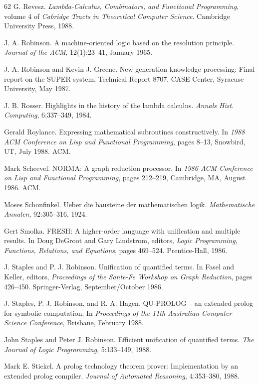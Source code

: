 \begin{thebibliography}{62}
G. Revesz.
\emph{Lambda-Calculus, Combinators, and Functional Programming}, volume 4 of
\emph{Cabridge Tracts in Theoretical Computer Science}.
Cambridge University Press, 1988.

J. A. Robinson.
A machine-oriented logic based on the resolution principle.
\emph{Journal of the ACM}, 12(1):23--41, January 1965.

J. A. Robinson and Kevin J. Greene.
New generation knowledge processing: Final report on the SUPER system.
Technical Report 8707, CASE Center, Syracuse University, May 1987.

J. B. Rosser.
Highlights in the history of the lambda calculus.
\emph{Annals Hist. Computing}, 6:337--349, 1984.

Gerald Roylance.
Expressing mathematical subroutines constructively.
In \emph{1988 ACM Conference on Lisp and Functional Programming}, pages 8--13,
Snowbird, UT, July 1988. ACM.

Mark Scheevel.
NORMA: A graph reduction processor.
In \emph{1986 ACM Conference on Lisp and Functional Programming}, pages 212--219,
Cambridge, MA, August 1986. ACM.

Moses Schonfinkel.
Ueber die bausteine der mathematischen logik.
\emph{Mathematische Annalen}, 92:305--316, 1924.

Gert Smolka.
FRESH: A higher-order language with unification and multiple results.
In Doug DeGroot and Gary Lindstrom, editors, \emph{Logic Programming,
Functions, Relations, and Equations}, pages 469--524. Prentice-Hall, 1986.

J. Staples and P. J. Robinson.
Unification of quantified terms.
In Fasel and Keller, editors, \emph{Proceedings of the Sante-Fe Workshop on
Graph Reduction}, pages 426--450. Springer-Verlag, September/October 1986.

J. Staples, P. J. Robinson, and R. A. Hagen.
QU-PROLOG -- an extended prolog for symbolic computation.
In \emph{Proceedings of the 11th Australian Computer Science Conference},
Brisbane, February 1988.

John Staples and Peter J. Robinson.
Efficient unification of quantified terms.
\emph{The Journal of Logic Programming}, 5:133--149, 1988.

Mark E. Stickel.
A prolog technology theorem prover: Implementation by an extended prolog
compiler.
\emph{Journal of Automated Reasoning}, 4:353--380, 1988.


\end{thebibliography}
